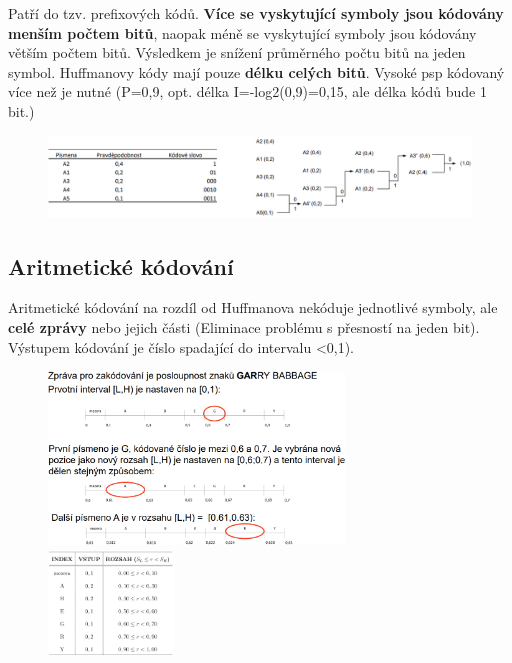 Patří do tzv. prefixových kódů. \textbf{Více se vyskytující symboly jsou kódovány menším počtem bitů}, naopak méně se vyskytující symboly jsou kódovány větším počtem bitů. Výsledkem je snížení průměrného počtu bitů na jeden symbol. Huffmanovy kódy mají pouze \textbf{délku celých bitů}. Vysoké psp kódovaný více než je nutné (P=0,9, opt. délka I=-log2(0,9)=0,15, ale délka kódů bude 1 bit.)

\begin{figure}[ht]
    \centering
    \includegraphics[width=0.9\linewidth]{images/huff.png}
\end{figure}
\FloatBarrier


\subsection{Aritmetické kódování}

Aritmetické kódování na rozdíl od Huffmanova nekóduje jednotlivé symboly,
ale \textbf{celé zprávy} nebo jejich části (Eliminace problému s přesností na jeden bit). Výstupem kódování je číslo spadající do intervalu <0,1). 

\begin{figure}[ht]
    \includegraphics[width=0.7\textwidth]{images/ar.png}
    \hfill
    \includegraphics[width=0.3\textwidth]{images/hufff.png}
\end{figure}
\FloatBarrier

